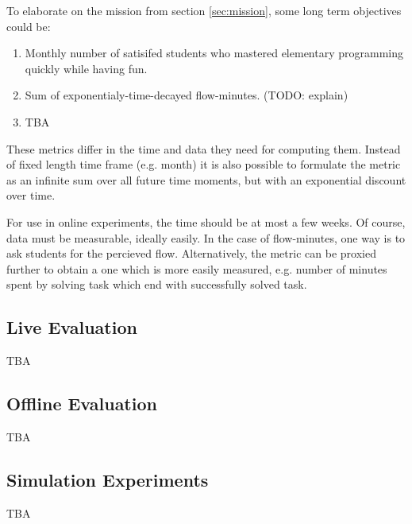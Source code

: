 To elaborate on the mission from section \ref{sec:mission},
  some long term objectives could be:

\begin{enumerate}
  \item Monthly number of satisifed students who mastered elementary programming quickly while having fun.
  \item Sum of exponentialy-time-decayed flow-minutes. (TODO: explain)
  \item TBA
\end{enumerate}

These metrics differ in the time and data they need for computing them.
Instead of fixed length time frame (e.g. month)
  it is also possible to formulate the metric as
  an infinite sum over all future time moments,
  but with an exponential discount over time.

For use in online experiments, the time should be at most a few weeks.
Of course, data must be measurable, ideally easily.
In the case of flow-minutes, one way is to ask students for the percieved flow.
Alternatively, the metric can be proxied further to obtain a one
  which is more easily measured,
  e.g. number of minutes spent by solving task which end with successfully solved task.

\subsection{Live Evaluation}
TBA


\subsection{Offline Evaluation}
TBA


\subsection{Simulation Experiments}
TBA











